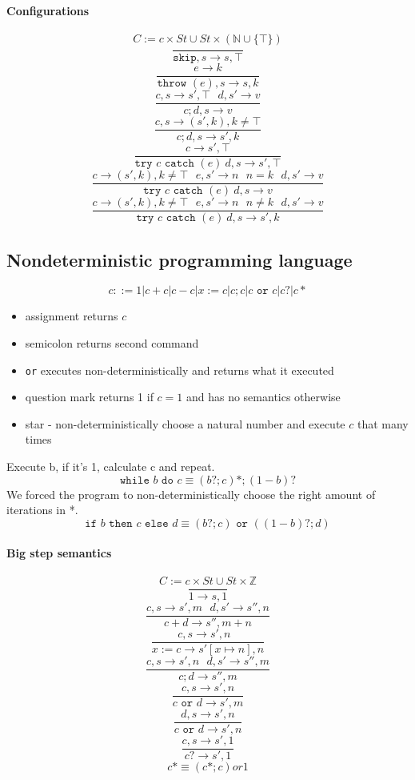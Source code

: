 \documentclass{article}
\begin{document}
\paragraph{Configurations}
$$C:=c\times St\cup St\times(\mathbb{N}\cup\{\top\})$$
$$\frac{}{\texttt{skip}, s\rightarrow s,\top}$$
$$\frac{e\rightarrow k}{\texttt{throw }(e), s\rightarrow s,k}$$
$$\frac{
	c,s\rightarrow s',\top\ \ \ 
	d,s'\rightarrow v
}{
	c;d, s\rightarrow v
}$$
$$\frac{
	c,s\rightarrow (s',k), k\not=\top
}{
	c;d, s\rightarrow s',k
}$$
$$\frac{
	c\rightarrow s',\top
}{
	\texttt{try } c \texttt{ catch }(e)\ d, s\rightarrow s',\top
}$$
$$\frac{
	c\rightarrow (s',k), k\not=\top\ \ \ 
	e,s'\rightarrow n\ \ \ 
	n=k\ \ \ 
	d,s'\rightarrow v
}{
	\texttt{try } c \texttt{ catch }(e)\ d, s\rightarrow v
}$$
$$\frac{
	c\rightarrow (s',k), k\not=\top\ \ \ 
	e,s'\rightarrow n\ \ \ 
	n\not=k\ \ \ 
	d,s'\rightarrow v
}{
	\texttt{try } c \texttt{ catch }(e)\ d, s\rightarrow s',k
}$$

\subsection{Nondeterministic programming language}
$$c::=1|c+c|c-c|x:=c|c;c|c\texttt{ or } c|c?|c*$$
\begin{itemize}
\item assignment returns $c$
\item semicolon returns second command
\item \texttt{or} executes non-deterministically and returns what it executed
\item question mark returns 1 if $c = 1$ and has no semantics otherwise
\item star - non-deterministically choose a natural number and execute $c$ that many times
\end{itemize}
Execute b, if it's 1, calculate c and repeat.
$$\texttt{while }b\texttt{ do } c\equiv (b?;c)*;(1-b)?$$
We forced the program to non-deterministically choose the right amount of iterations in *.
$$ \texttt{if }b\texttt{ then }c\texttt{ else }d\equiv (b?;c)\texttt{ or }((1-b)?;d) $$
\paragraph{Big step semantics}
$$ C:=c\times St\cup St\times\mathbb{Z} $$
$$\frac{}{1\rightarrow s,1}$$
$$\frac{
	c,s\rightarrow s',m\ \ \ 
	d,s'\rightarrow s'',n
}{c+d\rightarrow s'',m+n}$$
$$\frac{
	c,s\rightarrow s',n\ \ \ 
}{x:=c\rightarrow s'[x\mapsto n],n}$$
$$\frac{
	c,s\rightarrow s',n\ \ \ 
	d,s'\rightarrow s'',m
}{c;d\rightarrow s'',m}$$
$$\frac{
	c,s\rightarrow s',n
}{c\texttt{ or }d\rightarrow s',m}$$
$$\frac{
	d,s\rightarrow s',n
}{c\texttt{ or }d\rightarrow s',n}$$
$$\frac{
	c,s\rightarrow s',1
}{c?\rightarrow s',1}$$
$$c*\equiv (c*;c) or 1$$
\end{document}
